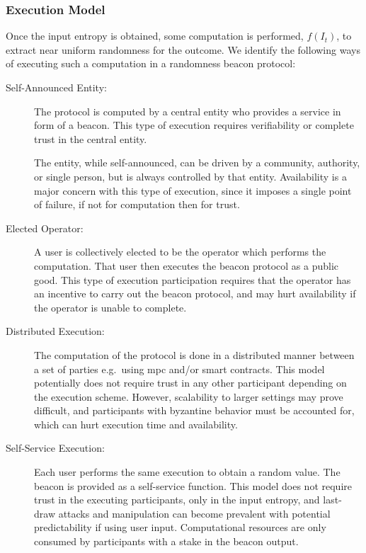 \subsubsection{Execution Model}
Once the input entropy is obtained, some computation is performed, $f(I_t)$, to extract near uniform randomness for the outcome.
We identify the following ways of executing such a computation in a randomness beacon protocol:

\begin{description}
    \item[Self-Announced Entity:]
        The protocol is computed by a central entity who provides a service in form of a beacon.
        This type of execution requires verifiability or complete trust in the central entity.

        The entity, while self-announced, can be driven by a community, authority, or single person, but is always controlled by that entity.
        Availability is a major concern with this type of execution, since it imposes a single point of failure, if not for computation then for trust.

    \item[Elected Operator:]
        A user is collectively elected to be the operator which performs the computation.
        That user then executes the beacon protocol as a public good.
        This type of execution participation requires that the operator has an incentive to carry out the beacon protocol, and may hurt availability if the operator is unable to complete.

    \item[Distributed Execution:]
        The computation of the protocol is done in a distributed manner between a set of parties e.g.\ using \gls{mpc} and/or smart contracts.
        This model potentially does not require trust in any other participant depending on the execution scheme.
        However, scalability to larger settings may prove difficult, and participants with byzantine behavior must be accounted for, which can hurt execution time and availability.

    \item[Self-Service Execution:]
        Each user performs the same execution to obtain a random value. The beacon is provided as a self-service function.
        This model does not require trust in the executing participants, only in the input entropy, and last-draw attacks and manipulation can become prevalent with potential predictability if using user input.
        Computational resources are only consumed by participants with a stake in the beacon output.
\end{description}

